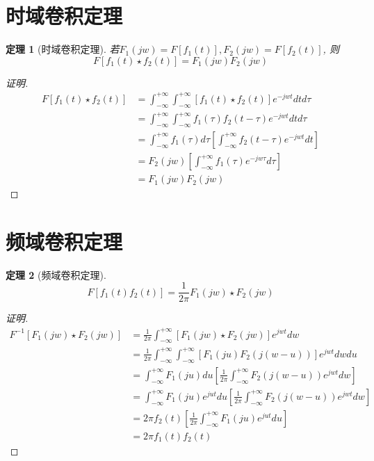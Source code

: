 \documentclass[12pt,a4paper]{article}
\newtheorem{theorem}{定理}
\begin{document}
	
	\noindent
	
\section{时域卷积定理}	

	\begin{theorem}[时域卷积定理]
		
			若$F_1(j w) = F[f_1(t)], F_2(j w) = F[f_2(t)]$, 则$$F\left[f_1(t) \star f_2(t)\right]=F_1(j w) F_2(j w)$$
	\end{theorem}
	
	\begin{proof}[证明]
		\begin{equation*}
			\begin{aligned}
				F\left[f_1(t) \star f_2(t)\right] & =\int_{-\infty}^{+\infty} \int_{-\infty}^{+\infty}\left[f_1(t) \star f_2(t)\right] e^{-j w t} d t d \tau \\
				& =\int_{-\infty}^{+\infty} \int_{-\infty}^{+\infty} f_1(\tau) f_2(t-\tau) e^{-j w t} d t d \tau \\
				& =\int_{-\infty}^{+\infty} f_1(\tau) d \tau\left[\int_{-\infty}^{+\infty} f_2(t-\tau) e^{-j w t} d t\right] \\
				& =F_2(j w)\left[\int_{-\infty}^{+\infty} f_1(\tau) e^{-j w \tau} d \tau\right] \\
				& =F_1(j w) F_2(j w)
			\end{aligned}
		\end{equation*}
	\end{proof}
	
\section{频域卷积定理}
	\begin{theorem}[频域卷积定理]
		$$
		F[f_1(t)f_2(t)] = \frac{1}{2\pi} F_1(j w) \star F_2(j w)
		$$
	\end{theorem}
	
	\begin{proof}[证明]
		\begin{equation*}
			\begin{aligned}
				F^{-1}\left[F_1(j w) \star F_2(j w)\right] & =\frac{1}{2 \pi} \int_{-\infty}^{+\infty}\left[F_1(j w) \star F_2(j w)\right] e^{j w t} d w \\
				& =\frac{1}{2 \pi} \int_{-\infty}^{+\infty} \int_{-\infty}^{+\infty}\left[F_1(j u) F_2(j(w-u))\right] e^{j w t} d w d u \\
				& =\int_{-\infty}^{+\infty} F_1(j u) d u\left[\frac{1}{2 \pi} \int_{-\infty}^{+\infty} F_2(j(w-u)) e^{j w t} d w\right] \\
				& =\int_{-\infty}^{+\infty} F_1(j u) e^{j u t} d u\left[\frac{1}{2 \pi} \int_{-\infty}^{+\infty} F_2(j(w-u)) e^{j w t} d w\right] \\
				& =2 \pi f_2(t)\left[\frac{1}{2 \pi} \int_{-\infty}^{+\infty} F_1(j u) e^{j u t} d u\right] \\
				& =2 \pi f_1(t) f_2(t)
			\end{aligned}
		\end{equation*}
	\end{proof}
\end{document}
